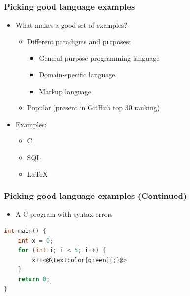 \documentclass[t,24pt,serif,aspectratio=169]{beamer}
\begin{document}
\begin{frame}[hvid]
    \frametitle{Picking good language examples}
    \begin{itemize}
        \item What makes a good set of examples?
              \begin{itemize}
                  \item Different paradigms and purposes:
                        \begin{itemize}
                            \item General purpose programming language
                            \item Domain-specific language
                            \item Markup language
                        \end{itemize}
                  \item Popular (present in GitHub top 30 ranking)
              \end{itemize}
              \pause
        \item Examples:
              \begin{itemize}
                  \item C
                  \item SQL
                  \item \LaTeX
              \end{itemize}
    \end{itemize}
\end{frame}

\begin{frame}[fragile]
    \frametitle{Picking good language examples (Continued)}

    \begin{multicols}{2}
        \begin{itemize}
            \item A C program with syntax errors

        \end{itemize}
        \columnbreak
        \begin{lstlisting}[language=c]
int main() {
    int x = 0;
    for (int i; i < 5; i++) {
        x++<@\textcolor{green}{;}@>
    }
    return 0;
}
    \end{lstlisting}
    \end{multicols}
\end{frame}
\end{document}

